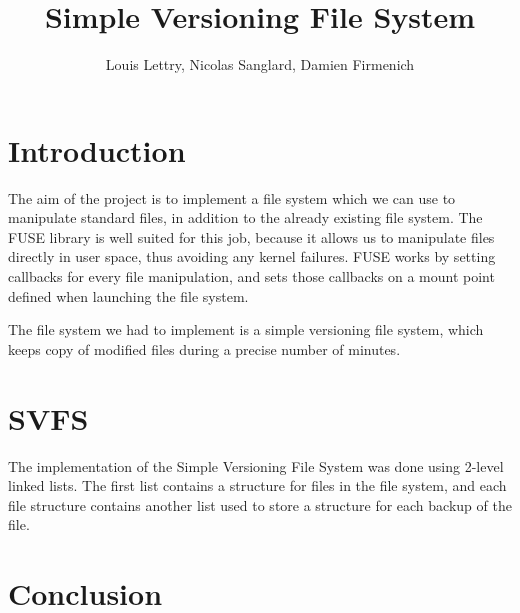 \documentclass[a4paper]{article}
\title{Simple Versioning File System}
\author{Louis Lettry, Nicolas Sanglard, Damien Firmenich}
\date{}
\begin{document}
\maketitle

\section{Introduction}
The aim of the project is to implement a file system which we can use to manipulate standard files, in addition to the already existing file system. The FUSE library is well suited for this job, because it allows us to manipulate files directly in user space, thus avoiding any kernel failures. FUSE works by setting callbacks for every file manipulation, and sets those callbacks on a mount point defined when launching the file system.

The file system we had to implement is a simple versioning file system, which keeps copy of modified files during a precise number of minutes.

\section{SVFS}
The implementation of the Simple Versioning File System was done using 2-level linked lists. The first list contains a structure for files in the file system, and each file structure contains another list used to store a structure for each backup of the file.

\section{Conclusion}
\end{document}
